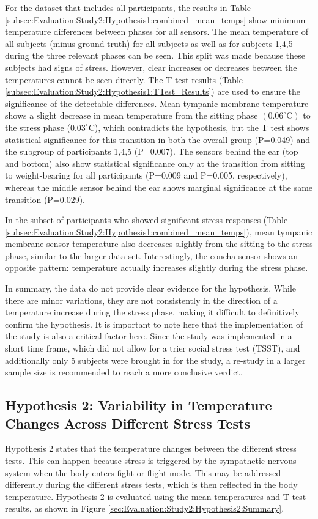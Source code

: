For the dataset that includes all participants, the results in Table \ref{subsec:Evaluation:Study2:Hypothesis1:combined_mean_temps} show minimum temperature differences between phases for all sensors. 
The mean temperature of all subjects (minus ground truth) for all subjects as well as for subjects 1,4,5 during the three relevant phases can be seen. 
This split was made because these subjects had signs of stress.
However, clear increases or decreases between the temperatures cannot be seen directly.
The T-test results (Table \ref{subsec:Evaluation:Study2:Hypothesis1:TTest_Results}) are used to ensure the significance of the detectable differences.
Mean tympanic membrane temperature shows a slight decrease in mean temperature from the sitting phase $(0.06^\circ \text{C})$ to the stress phase ($0.03^\circ \text{C}$), which contradicts the hypothesis, but the T test shows statistical significance for this transition in both the overall group (P=0.049) and the subgroup of participants 1,4,5 (P=0.007). 
The sensors behind the ear (top and bottom) also show statistical significance only at the transition from sitting to weight-bearing for all participants (P=0.009 and P=0.005, respectively), whereas the middle sensor behind the ear shows marginal significance at the same transition (P=0.029).

In the subset of participants who showed significant stress responses (Table \ref{subsec:Evaluation:Study2:Hypothesis1:combined_mean_temps}), mean tympanic membrane sensor temperature also decreases slightly from the sitting to the stress phase, similar to the larger data set. 
Interestingly, the concha sensor shows an opposite pattern: temperature actually increases slightly during the stress phase.

In summary, the data do not provide clear evidence for the hypothesis. 
While there are minor variations, they are not consistently in the direction of a temperature increase during the stress phase, making it difficult to definitively confirm the hypothesis. 
It is important to note here that the implementation of the study is also a critical factor here. 
Since the study was implemented in a short time frame, which did not allow for a trier social stress test (TSST), and additionally only 5 subjects were brought in for the study, a re-study in a larger sample size is recommended to reach a more conclusive verdict.

\subsection{Hypothesis 2: Variability in Temperature Changes Across Different Stress Tests}
\label{subsec:Evaluation:Study2:Hypothesis2}
Hypothesis 2 states that the temperature changes between the different stress tests. 
This can happen because stress is triggered by the sympathetic nervous system when the body enters fight-or-flight mode.
This may be addressed differently during the different stress tests, which is then reflected in the body temperature.
Hypothesis 2 is evaluated using the mean temperatures and T-test results, as shown in Figure \ref{sec:Evaluation:Study2:Hypothesis2:Summary}. 

